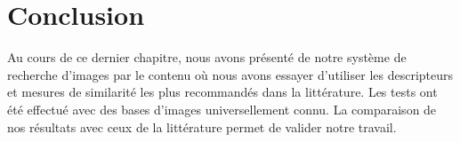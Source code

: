 \section{Conclusion}
Au cours de ce dernier chapitre, nous avons présenté de notre système de
recherche d’images par le contenu où nous avons essayer d’utiliser les descripteurs et mesures de similarité les plus recommandés dans la littérature. Les tests ont été effectué avec des bases d’images universellement connu. La comparaison de nos résultats avec ceux de la littérature permet de valider notre travail.